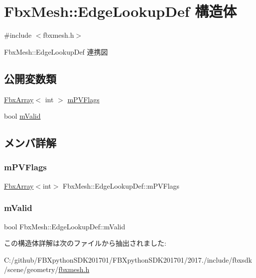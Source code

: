 \hypertarget{struct_fbx_mesh_1_1_edge_lookup_def}{}\section{Fbx\+Mesh\+:\+:Edge\+Lookup\+Def 構造体}
\label{struct_fbx_mesh_1_1_edge_lookup_def}


{\ttfamily \#include $<$fbxmesh.\+h$>$}



Fbx\+Mesh\+:\+:Edge\+Lookup\+Def 連携図
\subsection*{公開変数類}
\begin{DoxyCompactItemize}
\item 
\hyperlink{class_fbx_array}{Fbx\+Array}$<$ int $>$ \hyperlink{struct_fbx_mesh_1_1_edge_lookup_def_a9be52d962a2655941193eb55bdb7aafc}{m\+P\+V\+Flags}
\item 
bool \hyperlink{struct_fbx_mesh_1_1_edge_lookup_def_a9845197a148e934eceda317c95965a68}{m\+Valid}
\end{DoxyCompactItemize}


\subsection{メンバ詳解}
\mbox{\label{struct_fbx_mesh_1_1_edge_lookup_def_a9be52d962a2655941193eb55bdb7aafc}} 
\subsubsection{\texorpdfstring{m\+P\+V\+Flags}{mPVFlags}}
{\footnotesize\ttfamily \hyperlink{class_fbx_array}{Fbx\+Array}$<$int$>$ Fbx\+Mesh\+::\+Edge\+Lookup\+Def\+::m\+P\+V\+Flags}

\mbox{\label{struct_fbx_mesh_1_1_edge_lookup_def_a9845197a148e934eceda317c95965a68}} 
\subsubsection{\texorpdfstring{m\+Valid}{mValid}}
{\footnotesize\ttfamily bool Fbx\+Mesh\+::\+Edge\+Lookup\+Def\+::m\+Valid}



この構造体詳解は次のファイルから抽出されました\+:\begin{DoxyCompactItemize}
\item 
C\+:/github/\+F\+B\+Xpython\+S\+D\+K201701/\+F\+B\+Xpython\+S\+D\+K201701/2017./include/fbxsdk/scene/geometry/\hyperlink{fbxmesh_8h}{fbxmesh.\+h}\end{DoxyCompactItemize}
